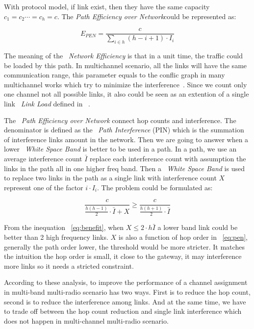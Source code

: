 With protocol model, if link exist, then they have the same capacity $c_1=c_2 \cdots =c_h=c$. 
The \emph{Path Efficiency over Network}could be represented as:


\begin{equation}
\label{eq:pen}
E_{PEN}=\frac{c}{\sum_{i \in h} (h-i+1)\cdot I_i}
\end{equation}
 

The meaning of the ~\emph{Network Efficiency} is that in a unit time, the traffic could be loaded by this path. 
In multichannel scenario, all the links will have the same communication range, this parameter equals to the conflic graph in many multichannel works which try to minimize the interference~\cite{jain2005impact}. 
Since we count only one channel not all possible links, it also could be seen as an extention of a single link ~\emph{Link Load} defined in ~\cite{raniwala2004centralized}.

The ~\emph{Path Efficiency over Network} connect hop counts and interference. The denominator is defined as the ~\emph{Path Interference} (PIN) which is the summation of interference links amount in the network.
Then we are going to answer when a lower ~\emph{White Space Band} is better to be used in a path.
In a path, we use an average interference count $\bar{I}$ replace each interference count with assumption the links in the path all in one higher freq band. Then a ~\emph{White Space Band} is used to replace two links in the path as a single link with interference count $X$ represent one of the factor $i\cdot I_i$. The problem could be formulated as:

 
\begin{equation}
\label{eq:benefit}
\frac{c}{\frac{h(h-1)}{2}\cdot \bar{I}+X} \geq \frac{c}{\frac{h(h+1)}{2}\cdot \bar{I}}
\end{equation}

From the inequation ~\ref{eq:benefit}, when $X \leq 2\cdot h\bar{I}$ a lower band link could be better than 2 high frequency links. $X$ is also a function of hop order in ~\ref{eq:pen}, generally the path order lower, the threshold would be more stricter. It matches the intuition the hop order is small, it close to the gateway, it may interference more links so it needs a stricted constraint.

According to these analysis, to improve the performance of a channel assignment in multi-band multi-radio scenario has two ways. First is to reduce the hop count, second is to reduce the interference among links. And at the same time, we have to trade off between the hop count reduction and single link interference which does not happen in multi-channel multi-radio scenario.



